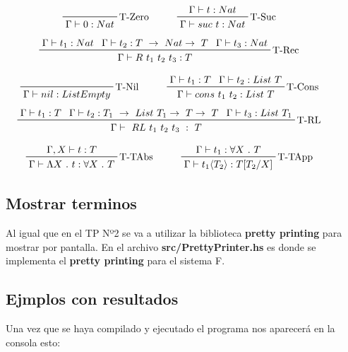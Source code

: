 \documentclass[12pt, titlepage, a4paper]{article}
\begin{document}
\begin{displaymath}
    \prftree[r]{T-Zero}{\Gamma \vdash 0 : Nat} \hspace{1cm}
    \prftree[r]{T-Suc}{\Gamma \vdash t : Nat}{\Gamma \vdash suc \ t : Nat} \hspace{1cm}
\end{displaymath}
\begin{displaymath}
    \prftree[r]{T-Rec}{\Gamma \vdash t_1 : Nat}{\Gamma \vdash t_2 : T \ \rightarrow \ Nat \rightarrow \ T}{\Gamma \vdash t_3 : Nat}{\Gamma \vdash R \ t_1 \ t_2 \ t_3 : T} \hspace{1cm}
\end{displaymath}

\begin{displaymath}
    \prftree[r]{T-Nil}{\Gamma \vdash nil : ListEmpty} \hspace{1cm}
    \prftree[r]{T-Cons}{\Gamma \vdash t_1 : T}{\Gamma \vdash t_2 : List \ T}{\Gamma \vdash cons \ t_1 \ t_2 :  List \ T} \hspace{1cm}
\end{displaymath}
\begin{displaymath}
    \prftree[r]{T-RL}{\Gamma \vdash t_1 : T}{\Gamma \vdash t_2 : T_1 \ \rightarrow \ List \ T_1 \rightarrow \ T \rightarrow \ T}{\Gamma \vdash t_3 : List \ T_1}{\Gamma \vdash \ RL \ t_1 \ t_2 \ t_3 \ : \ T} \hspace{1cm}
\end{displaymath}

\begin{displaymath}
    \prftree[r]{T-TAbs}{\Gamma, X \vdash t : T}{\Gamma \vdash \Lambda X \ . \ t : \forall X \ . \ T} \hspace{1cm}
    \prftree[r]{T-TApp}{\Gamma \vdash t_1 : \forall X \ . \ T}{\Gamma \vdash t_1 \langle T_2 \rangle : T[T_2/X]} \hspace{1cm}
\end{displaymath}

\subsection{Mostrar terminos}
Al igual que en el TP Nº2 \cite{tp2:lambdaCalculoSimpleTipado} se va a utilizar la biblioteca \textbf{pretty printing} para mostrar por 
pantalla. En el archivo
\textbf{src/PrettyPrinter.hs} es donde se implementa el \textbf{pretty printing} para el sistema F.

\subsection{Ejmplos con resultados}
Una vez que se haya compilado y ejecutado el programa nos aparecerá en la consola esto:
\end{document}
